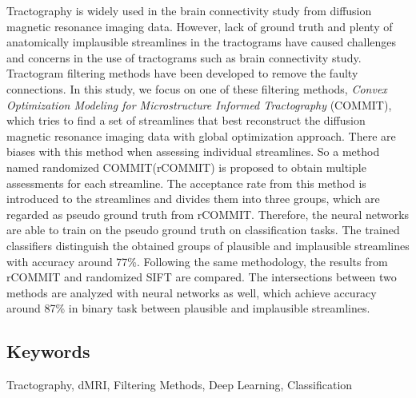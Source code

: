 Tractography is widely used in the brain connectivity study from diffusion magnetic resonance imaging data. 
However, lack of ground truth and plenty of 
anatomically implausible streamlines in the tractograms have caused challenges and concerns in the use of tractograms such as brain connectivity study.
Tractogram filtering methods have been developed to remove the faulty connections.
In this study, we focus on one of these filtering methods, \textit{Convex Optimization Modeling for Microstructure Informed Tractography} (COMMIT),
which tries to find a set of streamlines that best reconstruct the diffusion magnetic resonance imaging data with global optimization approach.
There are biases with this method when assessing individual streamlines. 
So a method named randomized COMMIT(rCOMMIT) is proposed to obtain multiple assessments for each streamline.
The acceptance rate from this method is introduced to the streamlines and divides them into three groups, which 
are regarded as pseudo ground truth from rCOMMIT. Therefore, the neural networks are able to train on the pseudo ground truth on 
classification tasks. The trained classifiers distinguish the obtained groups of plausible and implausible streamlines with accuracy around 77\%.
Following the same methodology, the results from rCOMMIT and randomized SIFT are compared. 
The intersections between two methods are analyzed with neural networks as well, which achieve accuracy around 87\% in binary task between plausible and implausible streamlines.



\subsection*{Keywords}
Tractography, dMRI, Filtering Methods, Deep Learning, Classification




\newpage
\thispagestyle{plain}
